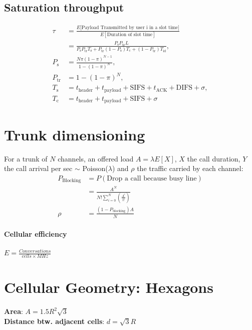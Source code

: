 \documentclass[6pt]{scrartcl}
\begin{document}
\begin{multicols}{4}
\subsection{Saturation throughput}

\begin{align*}
 \tau &= \frac{E\lbrack\textrm{Payload Transmitted by user i in a slot time}\rbrack}{E[\textrm{Duration of slot time}]} \\ 
 &= \frac{P_\textrm{s}P_{\textrm{tr}}L}{P_\textrm{s}P_{\textrm{tr}}T_{\textrm{s}} + P_\textrm{tr}(1-P_\textrm{s})T_\textrm{c} + (1-P_\textrm{tr})T_\textrm{id}}, \\
 P_\textrm{s} &= \frac{N\pi (1-\pi)^{N-1}}{1-(1-\pi)^N}, \\
 P_\textrm{tr} &= 1-(1-\pi)^N, \\
 T_\textrm{s} &= t_\textrm{header} + t_\textrm{payload} + \textrm{SIFS} + t_\textrm{ACK} + \textrm{DIFS} + \sigma,\\
 T_\textrm{c} &= t_\textrm{header} + t_\textrm{payload} + \textrm{SIFS} + \sigma
\end{align*}

\section{Trunk dimensioning}
For a trunk of $N$ channels, an offered load $A=\lambda E[X]$, $X$ the call duration, $Y$ the call arrival per sec $\sim$ Poisson($\lambda$) and $\rho$ the traffic carried by each channel: 
\begin{align*}
	P_\textrm{Blocking} &= P(\textrm{Drop a call because busy line})  \\
	&= \frac{A^N}{N!\sum^N_{i=0}(\frac{A^i}{i!})}\\
	\rho &= \frac{(1 - P_\textrm{blocking})A}{N}
\end{align*}


\paragraph{Cellular efficiency} $E = \frac{Conversations}{cells\times MHz}$

\section{Cellular Geometry: Hexagons}

\textbf{Area}: $A=1.5R^2\sqrt{3}$\\
\textbf{Distance btw. adjacent cells}: $d=\sqrt{3}R$


\end{multicols}
\end{document}
